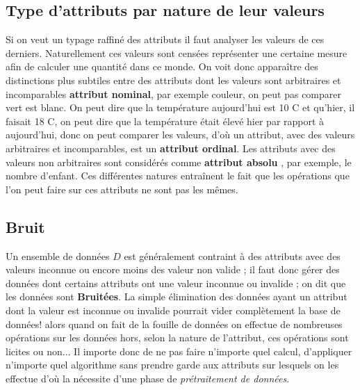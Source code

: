 \documentclass[runningheads,a4paper]{llncs}
\begin{document}
\subsection{Type d'attributs par nature de leur valeurs}
Si on veut un typage raffiné des attributs il faut analyser les valeurs de ces derniers. Naturellement ces valeurs sont censées représenter une certaine mesure afin de calculer une quantité dans ce monde. On voit donc apparaître des distinctions plus subtiles entre des attributs dont les valeurs sont arbitraires et incomparables \textbf{attribut nominal}, par exemple couleur, on peut pas comparer vert est blanc. On peut dire que la température aujourd'hui est 10 C et qu'hier, il faisait 18 C, on peut dire que la température était élevé hier par rapport à aujourd'hui, donc on peut comparer les valeurs, d’où un attribut, avec des valeurs arbitraires et incomparables, est un \textbf{attribut ordinal}. Les attributs  avec des valeurs non arbitraires sont considérés comme \textbf{attribut absolu} , par exemple, le nombre d'enfant. Ces différentes natures entraînent le fait que les opérations que l’on peut faire sur ces attributs ne sont pas les mêmes.
\subsection{Bruit}
Un ensemble de données $ D $ est généralement contraint à des attributs avec des valeurs inconnue ou encore moins des valeur non valide ; il faut donc gérer des données dont certains attributs ont une valeur inconnue ou invalide ; on dit que les données sont \textbf{Bruitées}.  La simple  élimination des données ayant un attribut dont la valeur est inconnue ou invalide pourrait vider complètement la base de données! alors quand on fait de la fouille de données on effectue de nombreuses opérations sur les données hors, selon la nature de l’attribut, ces
opérations sont licites ou non... Il importe donc de ne pas faire n’importe quel calcul, d’appliquer n’importe quel algorithme sans prendre garde aux attributs sur lesquels on les effectue d’où la nécessite d'une phase de \emph{prétraitement de données}. 
\end{document}
